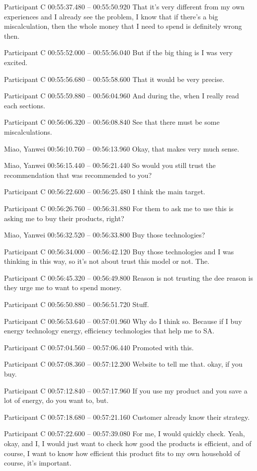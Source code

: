 {Participant C 00:55:37.480 -- 00:55:50.920
That it's very different from my own experiences and I already see the problem, I know that if there's a big miscalculation, then the whole money that I need to spend is definitely wrong then.

Participant C 00:55:52.000 -- 00:55:56.040
But if the big thing is I was very excited.

Participant C 00:55:56.680 -- 00:55:58.600
That it would be very precise.

Participant C 00:55:59.880 -- 00:56:04.960
And during the, when I really read each sections.

Participant C 00:56:06.320 -- 00:56:08.840
See that there must be some miscalculations.

Miao, Yanwei 00:56:10.760 -- 00:56:13.960
Okay, that makes very much sense.

Miao, Yanwei 00:56:15.440 -- 00:56:21.440
So would you still trust the recommendation that was recommended to you?

Participant C 00:56:22.600 -- 00:56:25.480
I think the main target.

Participant C 00:56:26.760 -- 00:56:31.880
For them to ask me to use this is asking me to buy their products, right?

Miao, Yanwei 00:56:32.520 -- 00:56:33.800
Buy those technologies?

Participant C 00:56:34.000 -- 00:56:42.120
Buy those technologies and I was thinking in this way, so it's not about trust this model or not. The.

Participant C 00:56:45.320 -- 00:56:49.800
Reason is not trusting the dee reason is they urge me to want to spend money.

Participant C 00:56:50.880 -- 00:56:51.720
Stuff.

Participant C 00:56:53.640 -- 00:57:01.960
Why do I think so. Because if I buy energy technology energy, efficiency technologies that help me to SA.

Participant C 00:57:04.560 -- 00:57:06.440
Promoted with this.

Participant C 00:57:08.360 -- 00:57:12.200
Website to tell me that. okay, if you buy.

Participant C 00:57:12.840 -- 00:57:17.960
If you use my product and you save a lot of energy, do you want to, but.

Participant C 00:57:18.680 -- 00:57:21.160
Customer already know their strategy.

Participant C 00:57:22.600 -- 00:57:39.080
For me, I would quickly check. Yeah, okay, and I, I would just want to check how good the products is efficient, and of course, I want to know how efficient this product fits to my own household of course, it's important.

}
